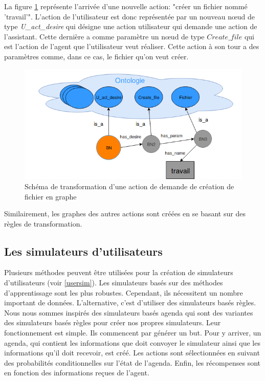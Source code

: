 \par La figure \ref{nonabstract_onto} représente l'arrivée d'une nouvelle action: "créer un fichier nommé 'travail'". L'action de l'utilisateur est donc représentée par un nouveau n\oe{}ud de type \textit{U\_act\_desire} qui désigne une action utilisateur qui demande une action de l'assistant. Cette dernière a comme paramètre un n\oe{}ud de type $Create\_file$ qui est l'action de l'agent que l'utilisateur veut réaliser. Cette action à son tour a des paramètres comme, dans ce cas, le fichier qu'on veut créer.
\begin{figure}[H] 
	\centering
	\includegraphics[width=0.88\linewidth]{images/Conception/DM/nonabstract_onto.png}
	\caption{Schéma de transformation d'une action de demande de création de fichier en graphe}\label{nonabstract_onto}
	
\end{figure}
\par Similairement, les graphes des autres actions sont créées en se basant sur des règles de transformation.
\subsection{Les simulateurs d'utilisateurs}
Plusieurs méthodes peuvent être utilisées pour la création de simulateurs d'utilisateurs (voir \ref{usersim}). Les simulateurs basés sur des méthodes d'apprentissage sont les plus robustes. Cependant, ils nécessitent un nombre important de données. L'alternative, c'est d'utiliser des simulateurs basés règles. Nous nous sommes inspirés des simulateurs basés agenda \citep{Schatzmann2007} qui sont des variantes des simulateurs basés règles pour créer nos propres simulateurs. Leur fonctionnement est simple. Ils commencent par générer un but. Pour y arriver, un agenda, qui contient les informations que doit convoyer le simulateur ainsi que les informations qu'il doit recevoir, est créé. Les actions sont sélectionnées en suivant des probabilités conditionnelles sur l'état de l'agenda. Enfin, les récompenses sont en fonction des informations reçues de l'agent.
